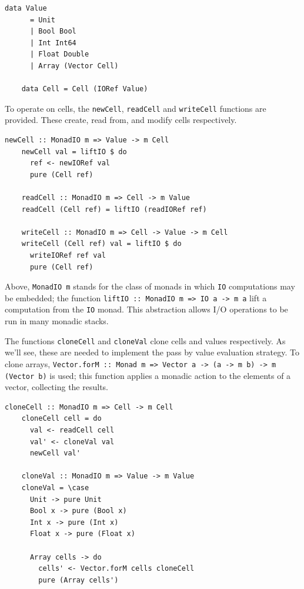 \documentclass[UdineBachThesis,american,11pt]{PhdThesis}
\begin{document}
  \begin{Verbatim}[gobble=4,fontsize=\small]
    data Value
      = Unit
      | Bool Bool
      | Int Int64
      | Float Double
      | Array (Vector Cell)

    data Cell = Cell (IORef Value)
  \end{Verbatim}

  To operate on cells, the \mbox{\texttt{newCell}}, \mbox{\texttt{readCell}} and
  \mbox{\texttt{writeCell}} functions are provided. These create, read from, and
  modify cells respectively.

  \begin{Verbatim}[gobble=4,fontsize=\small]
    newCell :: MonadIO m => Value -> m Cell
    newCell val = liftIO $ do
      ref <- newIORef val
      pure (Cell ref)

    readCell :: MonadIO m => Cell -> m Value
    readCell (Cell ref) = liftIO (readIORef ref)

    writeCell :: MonadIO m => Cell -> Value -> m Cell
    writeCell (Cell ref) val = liftIO $ do
      writeIORef ref val
      pure (Cell ref)
  \end{Verbatim}

  Above, \mbox{\texttt{MonadIO m}} stands for the class of monads in which
  \mbox{\texttt{IO}} computations may be embedded; the function
  \mbox{\texttt{liftIO :: MonadIO m => IO a -> m a}} lift a computation from the
  \mbox{\texttt{IO}} monad. This abstraction allows I/O operations to be run in
  many monadic stacks.

  The functions \mbox{\texttt{cloneCell}} and \mbox{\texttt{cloneVal}} clone
  cells and values respectively. As we'll see, these are needed to implement the
  pass by value evaluation strategy. To clone arrays,
  \mbox{\texttt{Vector.forM :: Monad m => Vector a -> (a -> m b) -> m (Vector b)}}
  is used; this function applies a monadic action to the elements of a vector,
  collecting the results.

  \begin{Verbatim}[gobble=4,fontsize=\small]
    cloneCell :: MonadIO m => Cell -> m Cell
    cloneCell cell = do
      val <- readCell cell
      val' <- cloneVal val
      newCell val'

    cloneVal :: MonadIO m => Value -> m Value
    cloneVal = \case
      Unit -> pure Unit
      Bool x -> pure (Bool x)
      Int x -> pure (Int x)
      Float x -> pure (Float x)

      Array cells -> do
        cells' <- Vector.forM cells cloneCell
        pure (Array cells')
  \end{Verbatim}
\end{document}
